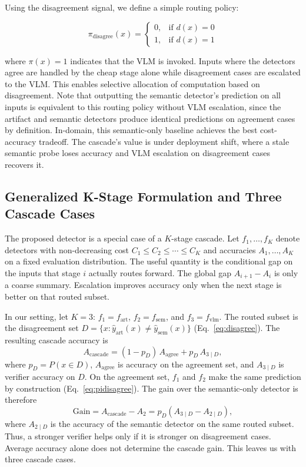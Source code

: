 \documentclass{ieeeaccess}
\begin{document}
Using the disagreement signal, we define a simple routing policy:

\begin{equation}
\pi_{\text{disagree}}(x) =
\begin{cases}
0, & \text{if } d(x) = 0 \\
1, & \text{if } d(x) = 1
\end{cases}
\label{eq:pidisagree}
\end{equation}

where $\pi(x) = 1$ indicates that the VLM is invoked. Inputs where the detectors agree are handled by the cheap stage alone while disagreement cases are escalated to the VLM. This enables selective allocation of computation based on disagreement. Note that outputting the
semantic detector's prediction on all inputs is equivalent to this routing policy without VLM escalation, since the artifact and semantic detectors produce identical predictions on
agreement cases by definition. In-domain, this semantic-only baseline achieves the best
cost-accuracy tradeoff. The cascade's value is under deployment shift, where a stale
semantic probe loses accuracy and VLM escalation on disagreement cases recovers it.

\subsection{Generalized K-Stage Formulation and Three Cascade Cases}
\label{sec:kstage}

The proposed detector is a special case of a $K$-stage cascade. Let
$f_1, \ldots, f_K$ denote detectors with non-decreasing cost
$C_1 \le C_2 \le \cdots \le C_K$ and accuracies $A_1, \ldots, A_K$ on a
fixed evaluation distribution. The useful quantity is the conditional gap
on the inputs that stage $i$ actually routes forward. The global gap
$A_{i+1}-A_i$ is only a coarse summary. Escalation improves accuracy only
when the next stage is better on that routed subset.

In our setting, let $K=3$: $f_1 = f_{\text{art}}$, $f_2 = f_{\text{sem}}$, and
$f_3 = f_{\text{vlm}}$. The routed subset is the disagreement set
$D = \{x : \hat y_{\text{art}}(x) \neq \hat y_{\text{sem}}(x)\}$
(Eq.~\eqref{eq:disagree}). The resulting cascade accuracy is
\begin{equation}
A_{\text{cascade}} = (1-p_D)\, A_{\text{agree}} + p_D\, A_{3\mid D},
\label{eq:decomp}
\end{equation}
where $p_D=P(x\in D)$, $A_{\text{agree}}$ is accuracy on the agreement set,
and $A_{3\mid D}$ is verifier accuracy on $D$. On the agreement set,
$f_1$ and $f_2$ make the same prediction by construction
(Eq.~\eqref{eq:pidisagree}). The gain over the semantic-only detector is
therefore
\begin{equation}
\text{Gain} = A_{\text{cascade}} - A_2
= p_D \left( A_{3\mid D} - A_{2\mid D} \right),
\label{eq:gain}
\end{equation}
where $A_{2\mid D}$ is the accuracy of the semantic detector on the same routed
subset. Thus, a stronger verifier helps only if it is stronger on
disagreement cases. Average accuracy alone does not determine the cascade gain.
This leaves us with three cascade cases.
\end{document}
